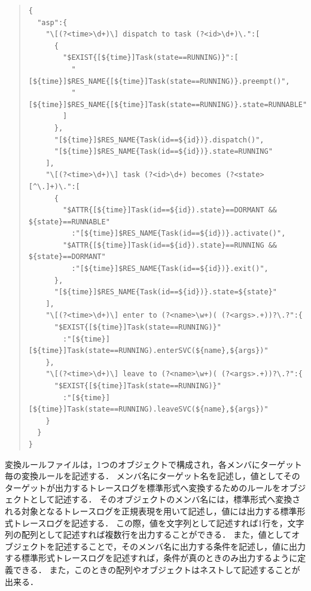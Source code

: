 \begin{table}[h]
{\scriptsize
\begin{quote}
\bkcounttrue
\begin{breakbox}
\setlength{\baselineskip}{0.8\normalbaselineskip}
\begin{verbatim}
{
  "asp":{
    "\[(?<time>\d+)\] dispatch to task (?<id>\d+)\.":[
      {
        "$EXIST{[${time}]Task(state==RUNNING)}":[
          "[${time}]$RES_NAME{[${time}]Task(state==RUNNING)}.preempt()",
          "[${time}]$RES_NAME{[${time}]Task(state==RUNNING)}.state=RUNNABLE"
        ]
      },
      "[${time}]$RES_NAME{Task(id==${id})}.dispatch()",
      "[${time}]$RES_NAME{Task(id==${id})}.state=RUNNING"
    ],
    "\[(?<time>\d+)\] task (?<id>\d+) becomes (?<state>[^\.]+)\.":[
      {
        "$ATTR{[${time}]Task(id==${id}).state}==DORMANT && ${state}==RUNNABLE"
          :"[${time}]$RES_NAME{Task(id==${id})}.activate()",
        "$ATTR{[${time}]Task(id==${id}).state}==RUNNING && ${state}==DORMANT"
          :"[${time}]$RES_NAME{Task(id==${id})}.exit()",
      },
      "[${time}]$RES_NAME{Task(id==${id})}.state=${state}"
    ],
    "\[(?<time>\d+)\] enter to (?<name>\w+)( (?<args>.+))?\.?":{
      "$EXIST{[${time}]Task(state==RUNNING)}"
        :"[${time}][${time}]Task(state==RUNNING).enterSVC(${name},${args})"
    },
    "\[(?<time>\d+)\] leave to (?<name>\w+)( (?<args>.+))?\.?":{
      "$EXIST{[${time}]Task(state==RUNNING)}"
        :"[${time}][${time}]Task(state==RUNNING).leaveSVC(${name},${args})"
    }
  }
}
\end{verbatim}
\end{breakbox}
\caption{変換ルールファイルの例}
\label{convertRuleFileSample}
\end{quote}
}
\end{table}

変換ルールファイルは，1つのオブジェクトで構成され，各メンバにターゲット毎の変換ルールを記述する．
メンバ名にターゲット名を記述し，値としてそのターゲットが出力するトレースログを標準形式へ変換するためのルールをオブジェクトとして記述する．
そのオブジェクトのメンバ名には，標準形式へ変換される対象となるトレースログを正規表現を用いて記述し，値には出力する標準形式トレースログを記述する．
この際，値を文字列として記述すれば1行を，文字列の配列として記述すれば複数行を出力することができる．
また，値としてオブジェクトを記述することで，そのメンバ名に出力する条件を記述し，値に出力する標準形式トレースログを記述すれば，条件が真のときのみ出力するように定義できる．
また，このときの配列やオブジェクトはネストして記述することが出来る．

